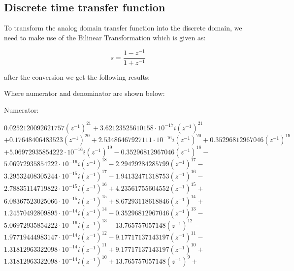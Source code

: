 \documentclass{scrartcl}
\begin{document}
\subsection{Discrete time transfer function}

To transform the analog domain transfer function into the discrete domain, we need to make use of the Bilinear Transformation which is given as:

$$s = \frac{1 - z^{-1}}{1 + z^{-1}}$$

after the conversion we get the following results:
\newpage

Where numerator and denominator are shown below:

Numerator:
\begin{center}
    $0.0252120092621757 \left(z^{-1}\right)^{21} + 3.62123525610158 \cdot 10^{-17} i \left(z^{-1}\right)^{21} $\\ 
    $+ 0.17648406483523 \left(z^{-1}\right)^{20} + 2.53486467927111 \cdot 10^{-16} i \left(z^{-1}\right)^{20} + 0.35296812967046 \left(z^{-1}\right)^{19} $\\
    $+ 5.06972935854222 \cdot 10^{-16} i \left(z^{-1}\right)^{19} - 0.35296812967046 \left(z^{-1}\right)^{18} -$\\
    $ 5.06972935854222 \cdot 10^{-16} i \left(z^{-1}\right)^{18} - 2.29429284285799 \left(z^{-1}\right)^{17} - $\\ 
    $3.29532408305244 \cdot 10^{-15} i \left(z^{-1}\right)^{17} - 1.94132471318753 \left(z^{-1}\right)^{16} - $\\ 
    $2.78835114719822 \cdot 10^{-15} i \left(z^{-1}\right)^{16} + 4.23561755604552 \left(z^{-1}\right)^{15} + $\\ 
    $6.08367523025066 \cdot 10^{-15} i \left(z^{-1}\right)^{15} + 8.67293118618846 \left(z^{-1}\right)^{14} + $\\ 
    $1.24570492809895 \cdot 10^{-14} i \left(z^{-1}\right)^{14} - 0.35296812967046 \left(z^{-1}\right)^{13} - $\\ 
    $5.06972935854222 \cdot 10^{-16} i \left(z^{-1}\right)^{13} - 13.765757057148 \left(z^{-1}\right)^{12} - $\\ 
    $1.97719444983147 \cdot 10^{-14} i \left(z^{-1}\right)^{12} - 9.17717137143197 \left(z^{-1}\right)^{11} - $\\ 
    $1.31812963322098 \cdot 10^{-14} i \left(z^{-1}\right)^{11} + 9.17717137143197 \left(z^{-1}\right)^{10} +$\\ 
    $ 1.31812963322098 \cdot 10^{-14} i \left(z^{-1}\right)^{10} + 13.765757057148 \left(z^{-1}\right)^{9} + $\\ 

\end{center}
\end{document}
